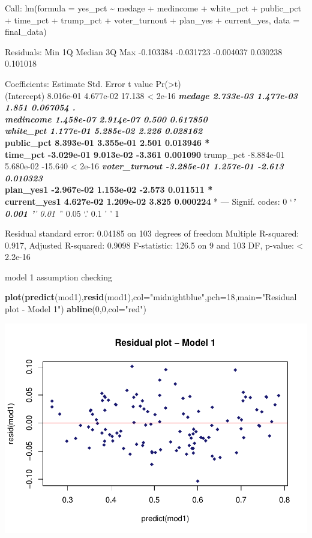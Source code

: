 \documentclass[
]{article}
\newenvironment{Shaded}{\begin{snugshade}}{\end{snugshade}}
\newcommand{\DataTypeTok}[1]{\textcolor[rgb]{0.13,0.29,0.53}{#1}}
\newcommand{\DecValTok}[1]{\textcolor[rgb]{0.00,0.00,0.81}{#1}}
\newcommand{\KeywordTok}[1]{\textcolor[rgb]{0.13,0.29,0.53}{\textbf{#1}}}
\newcommand{\NormalTok}[1]{#1}
\newcommand{\StringTok}[1]{\textcolor[rgb]{0.31,0.60,0.02}{#1}}
\begin{document}
Call: lm(formula = yes\_pct \textasciitilde{} medage + medincome +
white\_pct + public\_pct + time\_pct + trump\_pct + voter\_turnout +
plan\_yes + current\_yes, data = final\_data)

Residuals: Min 1Q Median 3Q Max -0.103384 -0.031723 -0.004037 0.030238
0.101018

Coefficients: Estimate Std. Error t value
Pr(\textgreater\textbar t\textbar)\\
(Intercept) 8.016e-01 4.677e-02 17.138 \textless{} 2e-16 \textbf{\emph{
medage 2.733e-03 1.477e-03 1.851 0.067054 .\\
medincome 1.458e-07 2.914e-07 0.500 0.617850\\
white\_pct 1.177e-01 5.285e-02 2.226 0.028162 }\\
public\_pct 8.393e-01 3.355e-01 2.501 0.013946 *\\
time\_pct -3.029e-01 9.013e-02 -3.361 0.001090 } trump\_pct -8.884e-01
5.680e-02 -15.640 \textless{} 2e-16 \textbf{\emph{ voter\_turnout
-3.285e-01 1.257e-01 -2.613 0.010323 }\\
plan\_yes1 -2.967e-02 1.153e-02 -2.573 0.011511 *\\
current\_yes1 4.627e-02 1.209e-02 3.825 0.000224 }* --- Signif. codes: 0
`\emph{\textbf{' 0.001 '}' 0.01 '}' 0.05 `.' 0.1 ' ' 1

Residual standard error: 0.04185 on 103 degrees of freedom Multiple
R-squared: 0.917, Adjusted R-squared: 0.9098 F-statistic: 126.5 on 9 and
103 DF, p-value: \textless{} 2.2e-16

model 1 assumption checking

\begin{Shaded}
\begin{Highlighting}[]
\KeywordTok{plot}\NormalTok{(}\KeywordTok{predict}\NormalTok{(mod1),}\KeywordTok{resid}\NormalTok{(mod1),}\DataTypeTok{col=}\StringTok{"midnightblue"}\NormalTok{,}\DataTypeTok{pch=}\DecValTok{18}\NormalTok{,}\DataTypeTok{main=}\StringTok{"Residual plot - Model 1"}\NormalTok{)}
\KeywordTok{abline}\NormalTok{(}\DecValTok{0}\NormalTok{,}\DecValTok{0}\NormalTok{,}\DataTypeTok{col=}\StringTok{"red"}\NormalTok{)}
\end{Highlighting}
\end{Shaded}

\includegraphics{Zhong_paper_files/figure-latex/unnamed-chunk-3-1.pdf}
\end{document}
